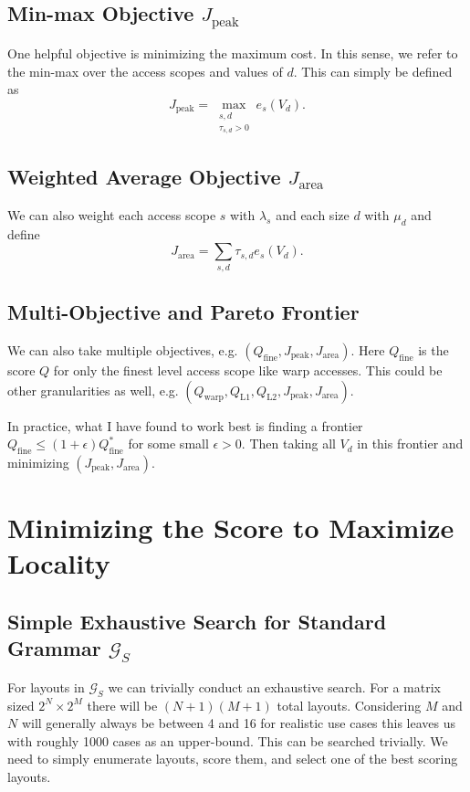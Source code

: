 \documentclass[10pt]{article}
\theoremstyle{remark}
\begin{document}
\subsection{Min-max Objective $J_{\text{peak}}$}

One helpful objective is minimizing the maximum cost. In this sense, we refer to the min-max over the access scopes and values of $d$. This can simply be defined as
%
\[
J_{\text{peak}} = \max_{\substack{s,d\\ \tau_{s,d} > 0}} e_{s}(V_d).
\]

\subsection{Weighted Average Objective $J_{\text{area}}$}

We can also weight each access scope $s$ with $\lambda_s$ and each size $d$ with $\mu_d$ and define
%
\[
J_{\text{area}} = \sum_{s,d} \tau_{s,d} e_{s}(V_d).
\]
%

\subsection{Multi-Objective and Pareto Frontier}

We can also take multiple objectives, e.g. $(Q_{\text{fine}}, J_{\text{peak}}, J_{\text{area}})$. Here $Q_\text{fine}$ is the score $Q$ for only the finest level access scope like warp accesses.
This could be other granularities as well, e.g. $(Q_\text{warp}, Q_\text{L1}, Q_\text{L2}, J_\text{peak}, J_\text{area})$.

In practice, what I have found to work best is finding a frontier $Q_\text{fine} \le (1+\epsilon)Q^*_\text{fine}$ for some small $\epsilon>0$. Then taking all $V_d$ in this frontier and minimizing $(J_\text{peak}, J_\text{area})$.

\section{Minimizing the Score to Maximize Locality}

\subsection{Simple Exhaustive Search for Standard Grammar $\mathcal{G}_S$}

For layouts in $\mathcal{G}_S$ we can trivially conduct an exhaustive search. For a matrix sized $2^N\times 2^M$ there will be $(N+1)(M+1)$ total layouts. Considering $M$ and $N$ will generally always be between 4 and 16 for realistic use cases this leaves us with roughly 1000 cases as an upper-bound. This can be searched trivially.
We need to simply enumerate layouts, score them, and select one of the best scoring layouts.
\end{document}
